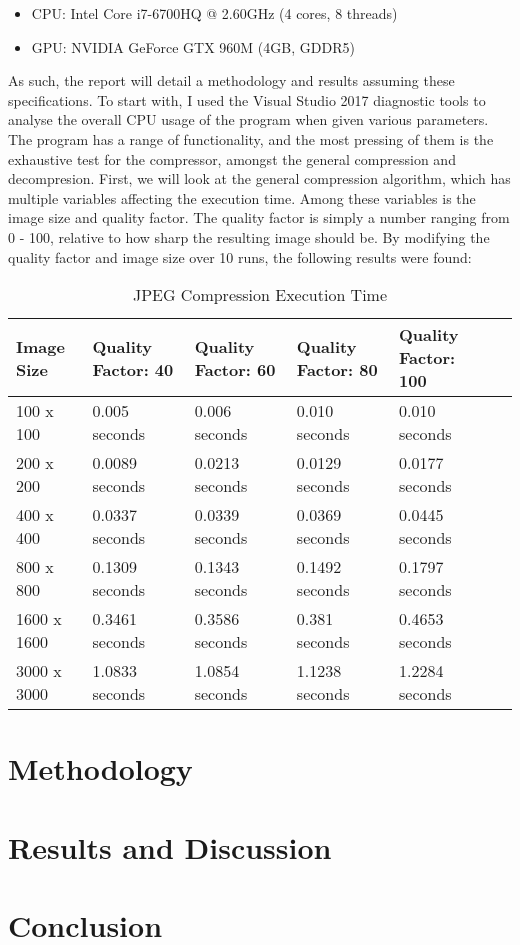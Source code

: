 \documentclass[12pt, a4paper]{article}
\begin{document}
\begin{itemize}
\item CPU: Intel Core i7-6700HQ @ 2.60GHz (4 cores, 8 threads)
\item GPU: NVIDIA GeForce GTX 960M (4GB, GDDR5) \\
\end{itemize}

As such, the report will detail a methodology and results assuming these specifications. To start with, I used the Visual Studio 2017 diagnostic tools to analyse the overall CPU usage of the program when given various parameters. The program has a range of functionality, and the most pressing of them is the exhaustive test for the compressor, amongst the general compression and decompresion. First, we will look at the general compression algorithm, which has multiple variables affecting the execution time. Among these variables is the image size and quality factor. The quality factor is simply a number ranging from 0 - 100, relative to how sharp the resulting image should be. By modifying the quality factor and image size over 10 runs, the following results were found: \\

\begin{table}[H]
    \centering
    \begin{tabular}{| l | l | l | l | l | l |}
    \hline
    Image Size & Quality Factor: 40 & Quality Factor: 60 & Quality Factor: 80 & Quality Factor: 100  \\ \hline
    100 x 100 & 0.005 seconds & 0.006 seconds & 0.010 seconds & 0.010 seconds \\ \hline
    200 x 200 & 0.0089 seconds & 0.0213 seconds & 0.0129 seconds & 0.0177 seconds \\ \hline
    400 x 400 & 0.0337 seconds & 0.0339 seconds & 0.0369 seconds & 0.0445 seconds \\ \hline
    800 x 800 & 0.1309 seconds & 0.1343 seconds & 0.1492 seconds & 0.1797 seconds \\ \hline
    1600 x 1600 & 0.3461 seconds & 0.3586 seconds & 0.381 seconds & 0.4653 seconds \\ \hline
    3000 x 3000 & 1.0833 seconds & 1.0854 seconds & 1.1238 seconds & 1.2284 seconds \\ \hline
    \end{tabular}
    \caption{JPEG Compression Execution Time}
\end{table}

\section{Methodology}

\section{Results and Discussion}

\section{Conclusion}

\newpage


{}
\nocite{*}
\end{document}
